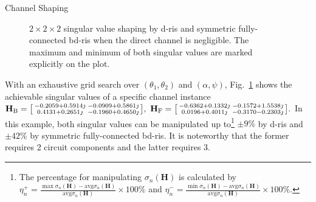 \documentclass[journal]{IEEEtran}
\begin{document}
\begin{section}{Channel Shaping}
\begin{example}
\begin{figure}
			\caption{$2 \times 2 \times 2$ singular value shaping by \gls{d}-\gls{ris} and symmetric fully-connected \gls{bd}-\gls{ris} when the direct channel is negligible.
			The maximum and minimum of both singular values are marked explicitly on the plot.}
			\label{fg:shaping_potential}
		\end{figure}
		With an exhaustive grid search over $(\theta_1, \theta_2)$ and $(\alpha, \psi)$, Fig.~\ref{fg:shaping_potential} shows the achievable singular values of a specific channel instance
		$
			\mathbf{H}_\mathrm{B} =
				\begin{bsmallmatrix}
					-0.2059 + 0.5914 \jmath & -0.0909 + 0.5861 \jmath \\
					0.4131 + 0.2651 \jmath  & -0.1960 + 0.4650 \jmath
				\end{bsmallmatrix}, \
				\mathbf{H}_\mathrm{F} =
				\begin{bsmallmatrix}
					-0.6362 + 0.1332 \jmath & -0.1572 + 1.5538 \jmath \\
					0.0196 + 0.4011 \jmath  & -0.3170 - 0.2303 \jmath
				\end{bsmallmatrix}.
		$
		In this example, both singular values can be manipulated up to\footnote{The percentage for manipulating $\sigma_n(\mathbf{H})$ is calculated by $\eta_n^+ = \frac{\max \sigma_n(\mathbf{H}) - \mathrm{avg} \sigma_n(\mathbf{H})}{\mathrm{avg} \sigma_n(\mathbf{H})} \times 100\%$ and  $\eta_n^- = \frac{\min \sigma_n(\mathbf{H}) - \mathrm{avg} \sigma_n(\mathbf{H})}{\mathrm{avg} \sigma_n(\mathbf{H})} \times 100\%$.} $\pm 9\%$ by \gls{d}-\gls{ris} and $\pm 42\%$ by symmetric fully-connected \gls{bd}-\gls{ris}.
		It is noteworthy that the former requires 2 circuit components and the latter requires 3.
	\end{example}


\end{section}
\end{document}

